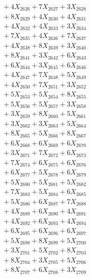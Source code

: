 \documentclass[a4paper,10pt]{article}
\begin{document}
{\begin{align}
&\;  + 4 X_{2626} + 7 X_{2627} + 3 X_{2628} \\[0.3ex]
&\;  + 8 X_{2629} + 4 X_{2630} + 4 X_{2631} \\[0.3ex]
&\;  + 4 X_{2632} + 4 X_{2633} + 3 X_{2634} \\[0.3ex]
&\;  + 7 X_{2635} + 4 X_{2636} + 7 X_{2637} \\[0.3ex]
&\;  + 4 X_{2638} + 8 X_{2639} + 3 X_{2640} \\[0.3ex]
&\;  + 8 X_{2641} + 3 X_{2642} + 6 X_{2643} \\[0.3ex]
&\;  + 6 X_{2644} + 3 X_{2645} + 6 X_{2646} \\[0.3ex]
&\;  + 4 X_{2647} + 7 X_{2648} + 5 X_{2649} \\[0.5ex]\allowbreak
&\;  + 4 X_{2650} + 7 X_{2651} + 3 X_{2652} \\[0.3ex]
&\;  + 5 X_{2653} + 5 X_{2654} + 8 X_{2655} \\[0.3ex]
&\;  + 5 X_{2656} + 5 X_{2657} + 3 X_{2658} \\[0.3ex]
&\;  + 3 X_{2659} + 8 X_{2660} + 5 X_{2661} \\[0.3ex]
&\;  + 3 X_{2662} + 3 X_{2663} + 5 X_{2664} \\[0.3ex]
&\;  + 8 X_{2665} + 5 X_{2666} + 8 X_{2667} \\[0.3ex]
&\;  + 6 X_{2668} + 6 X_{2669} + 6 X_{2670} \\[0.3ex]
&\;  + 3 X_{2671} + 7 X_{2672} + 6 X_{2673} \\[0.3ex]
&\;  + 7 X_{2674} + 6 X_{2675} + 6 X_{2676} \\[0.3ex]
&\;  + 6 X_{2677} + 5 X_{2678} + 6 X_{2679} \\[0.5ex]\allowbreak
&\;  + 5 X_{2680} + 5 X_{2681} + 5 X_{2682} \\[0.3ex]
&\;  + 7 X_{2683} + 5 X_{2684} + 6 X_{2685} \\[0.3ex]
&\;  + 5 X_{2686} + 6 X_{2687} + 7 X_{2688} \\[0.3ex]
&\;  + 4 X_{2689} + 6 X_{2690} + 4 X_{2691} \\[0.3ex]
&\;  + 4 X_{2692} + 6 X_{2693} + 4 X_{2694} \\[0.3ex]
&\;  + 6 X_{2695} + 6 X_{2696} + 6 X_{2697} \\[0.3ex]
&\;  + 5 X_{2698} + 8 X_{2699} + 5 X_{2700} \\[0.3ex]
&\;  + 3 X_{2701} + 5 X_{2702} + 8 X_{2703} \\[0.3ex]
&\;  + 8 X_{2704} + 3 X_{2705} + 5 X_{2706} \\[0.3ex]
&\;  + 8 X_{2707} + 6 X_{2708} + 3 X_{2709} \\[0.5ex]\allowbreak

\end{align}}
\end{document}
